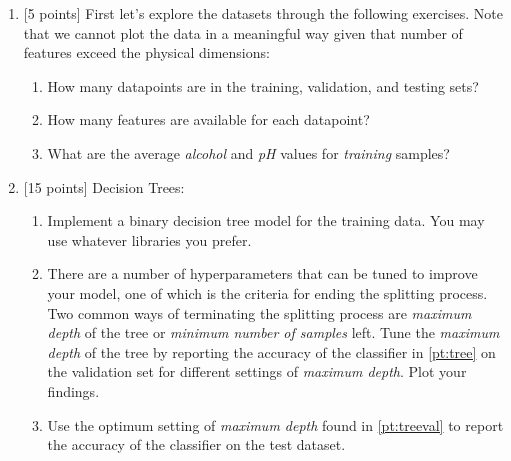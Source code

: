 \documentclass[12pt]{article}
\newenvironment{problem}[2][Problem:]{\begin{trivlist}
\item[\hskip \labelsep {\bfseries #1}\hskip \labelsep {\bfseries #2.}]}{\end{trivlist}}
\begin{document}
\begin{problem}{Decision Tree Classification [20 points]}
\begin{enumerate}
	\item {[5 points]} First let's explore the datasets through the following exercises. Note that we cannot plot the data in a meaningful way given that  number of features exceed the physical dimensions:
	\begin{enumerate}
		\item How many datapoints are in the training, validation, and testing sets?
		\item How many features are available for each datapoint?
		\item What are the average \textit{alcohol} and \textit{pH} values for \emph{training} samples?
	\end{enumerate}
	\item {[15 points]} Decision Trees:
	\begin{enumerate}
		\item Implement a binary decision tree model for the training data. You may use whatever libraries you prefer. \label{pt:tree}
		\item There are a number of hyperparameters that can be tuned to improve your model, one of which is the criteria for ending the splitting process. Two common ways of terminating the splitting process are \textit{maximum depth} of the tree or \textit{minimum number of samples} left. Tune the \textit{maximum depth} of the tree by reporting the accuracy of the classifier in \ref{pt:tree} on the validation set for different settings of \textit{maximum depth}. Plot your findings. \label{pt:treeval}
		\item Use the optimum setting of \textit{maximum depth} found in \ref{pt:treeval} to report the accuracy of the classifier on the test dataset. 
	\end{enumerate}
\end{enumerate}
\end{problem}
\end{document}
